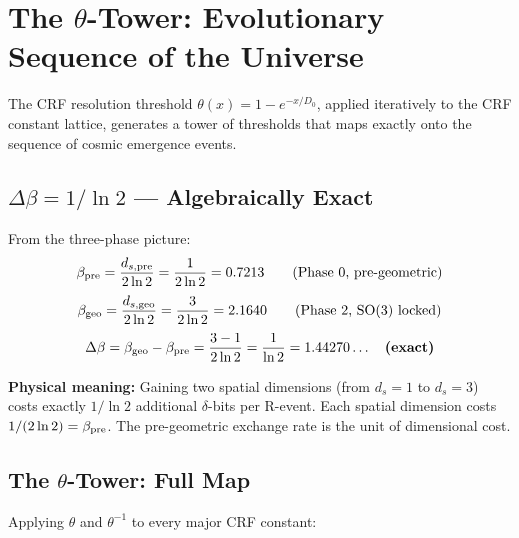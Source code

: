 \documentclass[12pt, a4paper]{article}
\begin{document}
\section{The $\theta$-Tower: Evolutionary Sequence of the Universe}

The CRF resolution threshold $\theta(x) = 1-e^{-x/D_0}$, applied iteratively to the
CRF constant lattice, generates a tower of thresholds that maps exactly onto the
sequence of cosmic emergence events.

\subsection{$\Delta\beta = 1/\ln 2$ --- Algebraically Exact}

\begin{keybox}[title={$\Delta\beta = \beta_{\rm geo} - \beta_{\rm pre} = 1/\ln 2$ (Exact)}]
From the three-phase picture:
\[
  \beta_{\rm pre} = \frac{d_{s,{\rm pre}}}{2\ln 2} = \frac{1}{2\ln 2} = 0.7213
  \qquad \text{(Phase 0, pre-geometric)}
\]
\[
  \beta_{\rm geo} = \frac{d_{s,{\rm geo}}}{2\ln 2} = \frac{3}{2\ln 2} = 2.1640
  \qquad \text{(Phase 2, SO(3) locked)}
\]
\[
  \Delta\beta = \beta_{\rm geo} - \beta_{\rm pre} = \frac{3-1}{2\ln 2} = \frac{1}{\ln 2} = 1.44270\ldots
  \quad \textbf{(exact)}
\]

\textbf{Physical meaning:} Gaining two spatial dimensions (from $d_s=1$ to $d_s=3$)
costs exactly $1/\ln 2$ additional $\delta$-bits per R-event. Each spatial dimension
costs $1/(2\ln 2) = \beta_{\rm pre}$. The pre-geometric exchange rate is the unit of dimensional cost.
\end{keybox}

\subsection{The $\theta$-Tower: Full Map}

Applying $\theta$ and $\theta^{-1}$ to every major CRF constant:
\end{document}
